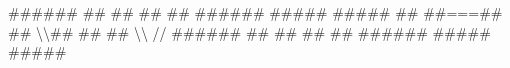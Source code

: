 \documentclass[]{tufte-handout}
\newenvironment{Shaded}{}{}
\newcommand{\NormalTok}[1]{#1}
\begin{document}
\begin{Shaded}
\begin{Highlighting}[]
\NormalTok{   ######    ##   ##    ##   ##    ######     #####  #####}
\NormalTok{ ##         ##===##    ## \textbackslash{}\textbackslash{}##   ##    ##     \textbackslash{}\textbackslash{}       //}
\NormalTok{ ######    ##   ##    ##   ##    ######    #####      #####}
\end{Highlighting}
\end{Shaded}


\end{document}
